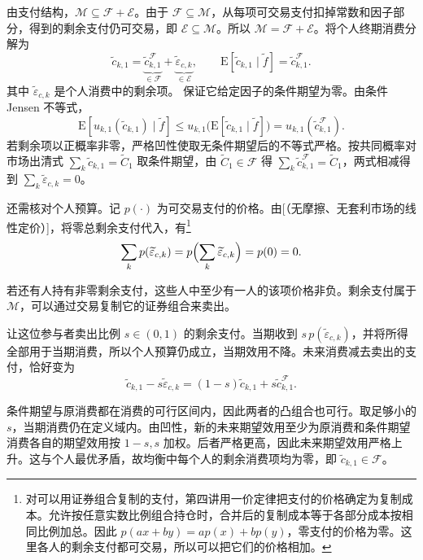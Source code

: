 \begin{solution}[label-content={证明},blank-type=none]
由支付结构，$\mathcal M\subseteq\mathcal F+\mathcal E$。由于 $\mathcal F\subseteq\mathcal M$，从每项可交易支付扣掉常数和因子部分，得到的剩余支付仍可交易，即 $\mathcal E\subseteq\mathcal M$。所以 $\mathcal M=\mathcal F+\mathcal E$。将个人终期消费分解为
\[
 \widetilde c_{k,1}
 =\underbrace{\widetilde c_{k,1}^{\mathcal F}}_{\in\mathcal F}
 +\underbrace{\widetilde\varepsilon_{c,k}}_{\in\mathcal E},
 \qquad
 \mathrm E[\widetilde c_{k,1}\mid\widetilde f]=\widetilde c_{k,1}^{\mathcal F}.
\]
其中 $\widetilde\varepsilon_{c,k}$ 是个人消费中的剩余项。 保证它给定因子的条件期望为零。由条件 Jensen 不等式，
\[
 \mathrm E[u_{k,1}(\widetilde c_{k,1})\mid\widetilde f]
 \le u_{k,1}\bigl(\mathrm E[\widetilde c_{k,1}\mid\widetilde f]\bigr)
 =u_{k,1}(\widetilde c_{k,1}^{\mathcal F}).
\]
若剩余项以正概率非零，严格凹性使取无条件期望后的不等式严格。按共同概率对市场出清式 $\sum_k\widetilde c_{k,1}=\widetilde C_1$ 取条件期望，由 $\widetilde C_1\in\mathcal F$ 得 $\sum_k\widetilde c_{k,1}^{\mathcal F}=\widetilde C_1$，两式相减得到 $\sum_k\widetilde\varepsilon_{c,k}=0$。

还需核对个人预算。记 $p(\cdot)$ 为可交易支付的价格。由[（无摩擦、无套利市场的线性定价）]，将零总剩余支付代入，有\footnote{对可以用证券组合复制的支付，第四讲用一价定律把支付的价格确定为复制成本。允许按任意实数比例组合持仓时，合并后的复制成本等于各部分成本按相同比例加总。因此 $p(ax+by)=ap(x)+bp(y)$，零支付的价格为零。这里各人的剩余支付都可交易，所以可以把它们的价格相加。}
\[
 \sum_k p(\widetilde\varepsilon_{c,k})
 =p\Bigl(\sum_k\widetilde\varepsilon_{c,k}\Bigr)=p(0)=0.
\]

若还有人持有非零剩余支付，这些人中至少有一人的该项价格非负。剩余支付属于 $\mathcal M$，可以通过交易复制它的证券组合来卖出。

让这位参与者卖出比例 $s\in(0,1)$ 的剩余支付。当期收到 $s\,p(\widetilde\varepsilon_{c,k})$，并将所得全部用于当期消费，所以个人预算仍成立，当期效用不降。未来消费减去卖出的支付，恰好变为
\[
 \widetilde c_{k,1}-s\widetilde\varepsilon_{c,k}
 =(1-s)\widetilde c_{k,1}+s\widetilde c_{k,1}^{\mathcal F}.
\]

条件期望与原消费都在消费的可行区间内，因此两者的凸组合也可行。取足够小的 $s$，当期消费仍在定义域内。由凹性，新的未来期望效用至少为原消费和条件期望消费各自的期望效用按 $1-s,s$ 加权。后者严格更高，因此未来期望效用严格上升。这与个人最优矛盾，故均衡中每个人的剩余消费项均为零，即 $\widetilde c_{k,1}\in\mathcal F$。


\end{solution}
